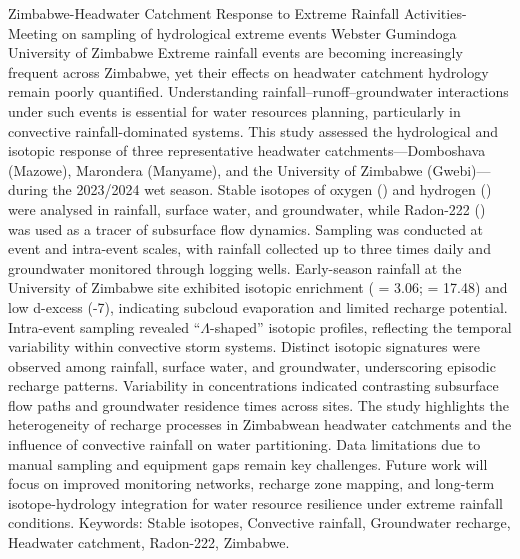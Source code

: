 \begin{conf-abstract}
{Zimbabwe-Headwater Catchment Response to Extreme Rainfall Activities-Meeting on sampling of hydrological extreme events}
{Webster	Gumindoga}
{University of Zimbabwe}
{Extreme rainfall events are becoming increasingly frequent across Zimbabwe, yet their effects on headwater catchment hydrology remain poorly quantified. Understanding rainfall–runoff–groundwater interactions under such events is essential for water resources planning, particularly in convective rainfall-dominated systems. This study assessed the hydrological and isotopic response of three representative headwater catchments—Domboshava (Mazowe), Marondera (Manyame), and the University of Zimbabwe (Gwebi)—during the 2023/2024 wet season. Stable isotopes of oxygen () and hydrogen () were analysed in rainfall, surface water, and groundwater, while Radon-222 () was used as a tracer of subsurface flow dynamics. Sampling was conducted at event and intra-event scales, with rainfall collected up to three times daily and groundwater monitored through logging wells. Early-season rainfall at the University of Zimbabwe site exhibited isotopic enrichment ( = 3.06\permil;  = 17.48\permil) and low d-excess (-7\permil), indicating subcloud evaporation and limited recharge potential. Intra-event sampling revealed “$\Lambda$-shaped” isotopic profiles, reflecting the temporal variability within convective storm systems. Distinct isotopic signatures were observed among rainfall, surface water, and groundwater, underscoring episodic recharge patterns. Variability in  concentrations indicated contrasting subsurface flow paths and groundwater residence times across sites. The study highlights the heterogeneity of recharge processes in Zimbabwean headwater catchments and the influence of convective rainfall on water partitioning. Data limitations due to manual sampling and equipment gaps remain key challenges. Future work will focus on improved monitoring networks, recharge zone mapping, and long-term isotope-hydrology integration for water resource resilience under extreme rainfall conditions. Keywords: Stable isotopes, Convective rainfall, Groundwater recharge, Headwater catchment, Radon-222, Zimbabwe.
}
\end{conf-abstract}
